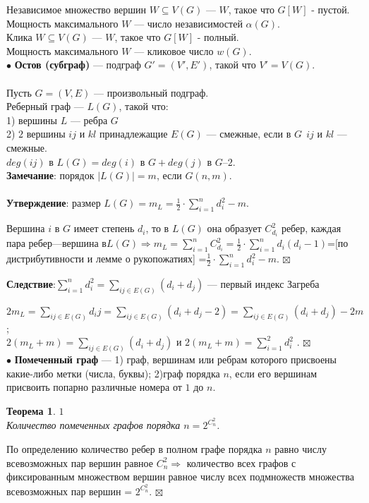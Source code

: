 \documentclass[a4paper, 12pt]{report}
\newenvironment{Proof} %
{\par\noindent{$\blacklozenge$}} %
{\hfill$\scriptstyle\boxtimes$} %
\newtheorem*{theorem}{Теорема} %
\begin{document}
Независимое множество вершин $W\subseteq V(G)$ — $W$, такое что $G[W]$ - пустой. \\
Мощность максимального $ W $ — число независимостей $ \alpha(G) $.\\
Клика $W\subseteq V(G)$ — $W$, такое что $G[W]$ - полный.\\
Мощность максимального $W$ — кликовое число $w(G)$.\\
$ \bullet $ \textbf{Остов (субграф)} — подграф $G'=(V',E')$, такой что $V'=V(G)$.\\\\
Пусть $G=(V,E)$ — произвольный подграф.\\
Реберный граф — $L(G)$, такой что:\\
1) вершины $L$ — ребра $G$\\
2) $2$ вершины $ ij $ и $ kl $ принадлежащие $ E(G) $ — смежные, если в $ G~~ ij $ и $ kl $ — смежные.\\
$ deg(ij) $ в $ L(G)=deg(i) $ в $G + deg(j) $ в $ G – 2 $.\\
\textbf{Замечание}: порядок $  |L(G)|=m$, если $G(n,m) $.\\\\
\textbf{Утверждение}: размер $ L(G)=m_L=\frac12 \cdot \sum\limits_{i=1}^n d_i^2  - m $.\\
\begin{Proof}
 Вершина $ i $ в $ G $ имеет степень $ d_i $, то в $ L(G) $ она образует $ C_{d_i}^2 $ ребер, каждая пара ребер—вершина в$  L(G) \Rightarrow m_L=\sum\limits_{i=1}^n  C_{d_i}^2  = \frac12 \cdot \sum\limits_{i=1}^n d_i (d_i - 1) $=[по дистрибутивности и лемме о рукопожатиях] =$\frac12 \cdot \sum\limits_{i=1}^n d_i^2  - m $.
\end{Proof}

\textbf{Следствие}:$ \sum\limits_{i=1}^n d_i^2 = \sum \limits_{ij\in E(G)} (d_i+d_j ) $  — первый индекс Загреба
\begin{Proof}
$ 2m_L=\sum \limits_{ij\in E(G)} d_ij =\sum \limits_{ij\in E(G)} (d_i + d_j - 2) =\sum \limits_{ij\in E(G)} (d_i + d_j ) - 2m $;\\
$ 2(m_L+m)= \sum \limits_{ij\in E(G)} (d_i+d_j ) $  и $ 2(m_L+m)= \sum \limits_{i=1}^2 d_i^2 $ .
\end{Proof}\\

$ \bullet $ \textbf{Помеченный граф} — 1) граф, вершинам или ребрам которого присвоены какие-либо метки (числа, буквы); 2)граф порядка $ n $, если его вершинам присвоить попарно различные номера от $ 1 $ до $ n $.\\
\begin{theorem} $1$\\
 Количество помеченных графов порядка $ n = 2^{C_n^2 } $.
\end{theorem}
\begin{Proof}
 По определению количество ребер в полном графе порядка $ n $ равно числу всевозможных пар вершин равное $ C_n^2 \Rightarrow $ количество всех графов с фиксированным множеством вершин равное числу всех подмножеств множества всевозможных пар вершин = $ 2^{C_n^2} $.
\end{Proof}




    
\end{document}

